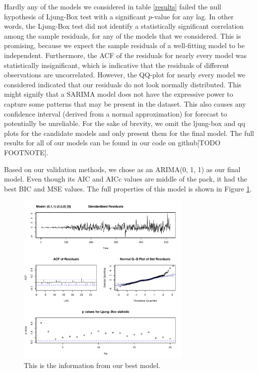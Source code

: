 \documentclass[11pt]{paper}
\begin{document}
Hardly any of the models we considered in table \ref{results} failed the null hypothesis of Ljung-Box test with a significant $p$-value for any lag. In other words, the Ljung-Box test did not identify a statistically significant correlation among the sample residuals, for any of the models that we considered. This is promising, because we expect the sample residuals of a well-fitting model to be independent. Furthermore, the ACF of the residuals for nearly every model was statistically insignificant, which is indicative that the residuals of different observations are uncorrelated. However, the QQ-plot for nearly every model we considered indicated that our residuals do not look normally distributed. This might signify that a SARIMA model does not have the expressive power to capture some patterns that may be present in the dataset. This also causes any confidence interval (derived from a normal approximation) for forecast to potentially be unreliable. For the sake of brevity, we omit the ljung-box and qq plots for the candidate models and only present them for the final model. The full results for all of our models can be found in our code on github[TODO FOOTNOTE].

Based on our validation methods, we chose as an ARIMA(0, 1, 1) as our final model. Even though its AIC and AICc values are middle of the pack, it had the best BIC and MSE values. The full properties of this model is shown in Figure \ref{best_mode}. 

\begin{figure}
\centering
    \includegraphics[width=0.75\textwidth]{../image/best_model.pdf}
\caption{This is the information from our best model.}
\label{best_mode}
\end{figure}
\end{document}
